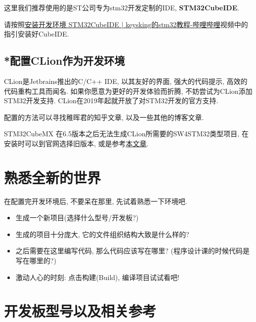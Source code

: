 这里我们推荐使用的是ST公司专为stm32开发定制的IDE, \textbf{STM32CubeIDE}.

请按照\href{https://b23.tv/ieviM3F}{安装开发环境 STM32CubeIDE | keysking的stm32教程-哔哩哔哩}视频中的指引安装好CubeIDE.

\subsection{*配置CLion作为开发环境}

CLion是Jetbrains推出的C/C++ IDE, 以其友好的界面, 强大的代码提示, 高效的代码重构工具而闻名. 如果你愿意为更好的开发体验而折腾, 不妨尝试为CLion添加STM32开发支持. CLion在2019年起就开放了对STM32开发的官方支持.

配置的方法可以寻找稚晖君的知乎文章, 以及一些其他的博客文章.

\begin{theorem}
	STM32CubeMX 在6.5版本之后无法生成CLion所需要的SW4STM32类型项目, 在安装时可以到官网选择旧版本, 或是参考\href{https://blog.csdn.net/m0_54490453/article/details/128921674}{本文章}.
\end{theorem}


\section{熟悉全新的世界}

在配置完开发环境后, 不要呆在那里, 先试着熟悉一下环境吧.

\begin{itemize}
	\item 生成一个新项目(选择什么型号/开发板?)
	\item 生成的项目十分庞大, 它的文件组织结构大致是什么样的?
	\item 之后需要在这里编写代码, 那么代码应该写在哪里? (程序设计课的时候代码是写在哪里的?)
	\item 激动人心的时刻: 点击构建(Build), 编译项目试试看吧!
\end{itemize}

\section{开发板型号以及相关参考}
